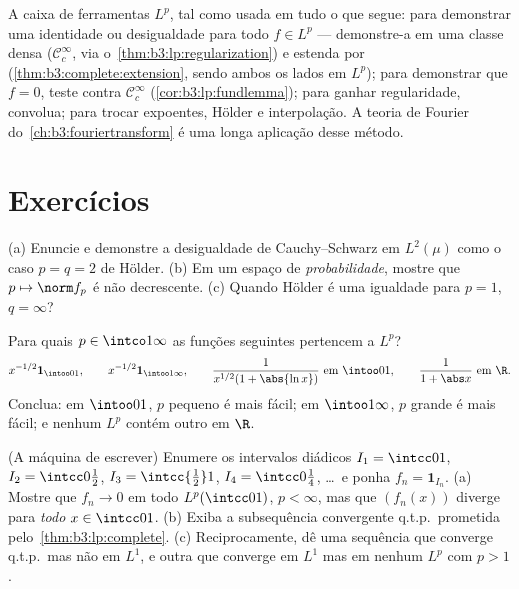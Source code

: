 \begin{method}\label{met:b3:lp:toolkit}
A caixa de ferramentas $L^p$, tal como usada em tudo o que segue:
para demonstrar uma identidade ou desigualdade para todo $f \in L^p$ ---
demonstre-a em uma classe densa ($\mathcal C_c^\infty$, via o~\cref{thm:b3:lp:regularization}) e estenda
por  (\cref{thm:b3:complete:extension}, sendo ambos os lados  em
$L^p$); para demonstrar que $f = 0$, teste contra $\mathcal
C_c^\infty$
(\cref{cor:b3:lp:fundlemma}); para ganhar regularidade, convolua; para trocar
expoentes, Hölder e interpolação. A teoria de Fourier do~\cref{ch:b3:fouriertransform} é uma longa aplicação desse método.
\end{method}

\section{Exercícios}

\begin{exercise}[$\star$]\label{exo:b3:lp:1}
(a) Enuncie e demonstre a desigualdade de Cauchy--Schwarz em $L^2(\mu)$ como
o caso $p = q = 2$ de Hölder.
(b) Em um espaço de \emph{probabilidade}, mostre que $p \mapsto \norm f_p$ é não
decrescente.
(c) Quando Hölder é uma igualdade para $p = 1$, $q = \infty$?
\end{exercise}

\begin{exercise}[$\star$]\label{exo:b3:lp:2}
Para quais $p \in \intco1\infty$ as funções seguintes pertencem a $L^p$?
\[
x^{-1/2}\mathbf 1_{\intoo01},\qquad
x^{-1/2}\mathbf 1_{\intoo1\infty},\qquad
\frac{1}{x^{1/2}(1 + \abs{\ln x})}\ \text{em } \intoo01,
\qquad
\frac1{1 + \abs x}\ \text{em } \R .
\]
Conclua: em $\intoo01$, $p$ pequeno é mais fácil; em $\intoo1\infty$, $p$ grande
é mais fácil; e nenhum $L^p$ contém outro em $\R$.
\end{exercise}

\begin{exercise}[$\star\star$]\label{exo:b3:lp:3}
(A máquina de escrever) Enumere os intervalos diádicos $I_1 =
\intcc01$, $I_2 = \intcc0{\frac12}$,
$I_3 = \intcc{\frac12}1$, $I_4 = \intcc0{\frac14}$, \dots\ e ponha $f_n = \mathbf
1_{I_n}$.
(a) Mostre que $f_n \to 0$ em todo $L^p(\intcc01)$, $p < \infty$, mas que $(f_n(x))$ diverge para
\emph{todo} $x \in \intcc01$.
(b) Exiba a subsequência convergente q.t.p.\ prometida
pelo~\cref{thm:b3:lp:complete}.
(c) Reciprocamente, dê uma sequência que converge q.t.p.\ mas não em
$L^1$, e outra que converge em $L^1$ mas em nenhum $L^p$ com
$p > 1$.
\end{exercise}

